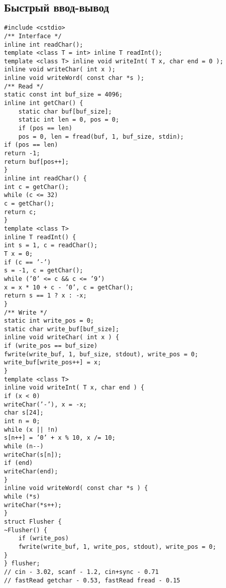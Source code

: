 \documentclass[14pt,fleqn]{article}
\begin{document}
\subsection{Быстрый ввод-вывод}
\begin{Verbatim}[tabsize=4]
#include <cstdio>
/** Interface */
inline int readChar();
template <class T = int> inline T readInt();
template <class T> inline void writeInt( T x, char end = 0 );
inline void writeChar( int x );
inline void writeWord( const char *s );
/** Read */
static const int buf_size = 4096;
inline int getChar() {
	static char buf[buf_size];
	static int len = 0, pos = 0;
	if (pos == len)
	pos = 0, len = fread(buf, 1, buf_size, stdin);
if (pos == len)
return -1;
return buf[pos++];
}
inline int readChar() {
int c = getChar();
while (c <= 32)
c = getChar();
return c;
}
template <class T>
inline T readInt() {
int s = 1, c = readChar();
T x = 0;
if (c == ’-’)
s = -1, c = getChar();
while (’0’ <= c && c <= ’9’)
x = x * 10 + c - ’0’, c = getChar();
return s == 1 ? x : -x;
}
/** Write */
static int write_pos = 0;
static char write_buf[buf_size];
inline void writeChar( int x ) {
if (write_pos == buf_size)
fwrite(write_buf, 1, buf_size, stdout), write_pos = 0;
write_buf[write_pos++] = x;
}
template <class T>
inline void writeInt( T x, char end ) {
if (x < 0)
writeChar(’-’), x = -x;
char s[24];
int n = 0;
while (x || !n)
s[n++] = ’0’ + x % 10, x /= 10;
while (n--)
writeChar(s[n]);
if (end)
writeChar(end);
}
inline void writeWord( const char *s ) {
while (*s)
writeChar(*s++);
}
struct Flusher {
~Flusher() {
	if (write_pos)
	fwrite(write_buf, 1, write_pos, stdout), write_pos = 0;
}
} flusher;
// cin - 3.02, scanf - 1.2, cin+sync - 0.71
// fastRead getchar - 0.53, fastRead fread - 0.15
\end{Verbatim}
\end{document}
